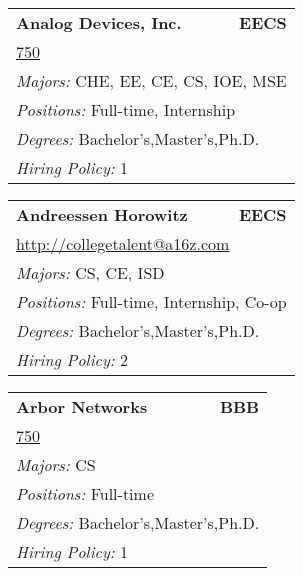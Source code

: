 \documentclass[twoside]{article}
\begin{document}
\begin{center}
\begin{multicols}{3}
\begin{FlushLeft}
\begin{minipage}{\columnwidth}
\end{minipage}
 
\begin{minipage}{\columnwidth}\begin{tabularx}{.95\columnwidth}{Xr}
                 {\Large\bf Analog Devices, Inc.} & {\Large\bf EECS}\\
    \multicolumn{2}{p{.95\columnwidth}}{\url{750}}\\
    \multicolumn{2}{p{.95\columnwidth}}{\emph{Majors:} CHE, EE, CE, CS, IOE, MSE}\\
    \multicolumn{2}{p{.95\columnwidth}}{\emph{Positions:} Full-time, Internship}\\
    \multicolumn{2}{p{.95\columnwidth}}{\emph{Degrees:} Bachelor's,Master's,Ph.D.}\\
    \multicolumn{2}{p{.95\columnwidth}}{\emph{Hiring Policy:} 1}\\
    \end{tabularx}
    
\end{minipage}
 
\begin{minipage}{\columnwidth}\begin{tabularx}{.95\columnwidth}{Xr}
                 {\Large\bf Andreessen Horowitz} & {\Large\bf EECS}\\
    \multicolumn{2}{p{.95\columnwidth}}{\url{http://collegetalent@a16z.com}}\\
    \multicolumn{2}{p{.95\columnwidth}}{\emph{Majors:} CS, CE, ISD}\\
    \multicolumn{2}{p{.95\columnwidth}}{\emph{Positions:} Full-time, Internship, Co-op}\\
    \multicolumn{2}{p{.95\columnwidth}}{\emph{Degrees:} Bachelor's,Master's,Ph.D.}\\
    \multicolumn{2}{p{.95\columnwidth}}{\emph{Hiring Policy:} 2}\\
    \end{tabularx}
    
\end{minipage}
 
\begin{minipage}{\columnwidth}\begin{tabularx}{.95\columnwidth}{Xr}
                 {\Large\bf Arbor Networks} & {\Large\bf BBB}\\
    \multicolumn{2}{p{.95\columnwidth}}{\url{750}}\\
    \multicolumn{2}{p{.95\columnwidth}}{\emph{Majors:} CS}\\
    \multicolumn{2}{p{.95\columnwidth}}{\emph{Positions:} Full-time}\\
    \multicolumn{2}{p{.95\columnwidth}}{\emph{Degrees:} Bachelor's,Master's,Ph.D.}\\
    \multicolumn{2}{p{.95\columnwidth}}{\emph{Hiring Policy:} 1}\\
    \end{tabularx}
    

\end{minipage}
\end{FlushLeft}
\end{multicols}
\end{center}
\end{document}

